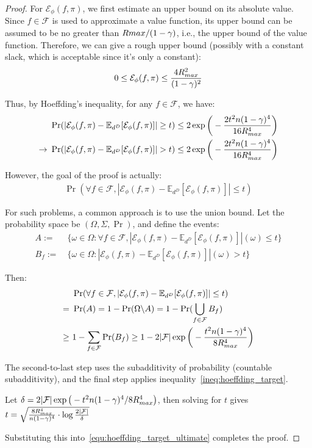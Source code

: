 \documentclass[10pt,a4paper]{amsart}
\newcommand{\CAL}[1]{\mathcal{#1}}
\begin{document}
\begin{proof}
For $\CAL{E}_\phi(f,\pi)$, we first estimate an upper bound on its absolute value. Since $f \in \CAL{F}$ is used to approximate a value function, its upper bound can be assumed to be no greater than $R{\rm max}/(1 - \gamma)$, i.e., the upper bound of the value function. Therefore, we can give a rough upper bound (possibly with a constant slack, which is acceptable since it’s only a constant):
\begin{align*}
0\leq \CAL{E}_\phi(f,\pi)\leq \frac{4R_{\rm max}^2}{(1-\gamma)^2}
\end{align*}

Thus, by Hoeffding’s inequality, for any $f \in \CAL{F}$, we have:
\begin{align}
&\ \Pr(|\mathcal{E}_\phi(f,\pi)-\mathbb{E}_{d^{D}}[\mathcal{E}_\phi(f,\pi)]|\geq t)\leq 2\exp\bigg(-\frac{2t^2n(1-\gamma)^4}{16R_{\rm max}^4}\bigg)\nonumber\\
        \to&\ \Pr(|\mathcal{E}_\phi(f,\pi)-\mathbb{E}_{d^{D}}[\mathcal{E}_\phi(f,\pi)]|> t)\leq 2\exp\bigg(-\frac{2t^2n(1-\gamma)^4}{16R_{\rm max}^4}\bigg)\label{ineq:hoeffding_target}
\end{align}

However, the goal of the proof is actually:
\begin{align}\label{equ:hoeffding_target_ultimate}
\Pr(\forall f\in\CAL{F}, |\mathcal{E}_\phi(f,\pi)-\mathbb{E}_{d^{D}}[\mathcal{E}_\phi(f,\pi)]|\leq t)
\end{align}

For such problems, a common approach is to use the union bound. Let the probability space be $(\Omega, \Sigma, \Pr)$, and define the events:
\begin{align*}
A:=&\ \{\omega\in\Omega:\forall f\in\CAL{F},|\mathcal{E}_\phi(f,\pi)-\mathbb{E}_{d^{D}}[\mathcal{E}_\phi(f,\pi)]|(\omega)\leq t\}\\
        B_f:=&\ \{\omega\in\Omega: |\mathcal{E}_\phi(f,\pi)-\mathbb{E}_{d^{D}}[\mathcal{E}_\phi(f,\pi)]|(\omega)> t\}
\end{align*}

Then:
\begin{align}
&\ \Pr(\forall f\in\CAL{F}, |\mathcal{E}_\phi(f,\pi)-\mathbb{E}_{d^{D}}[\mathcal{E}_\phi(f,\pi)]|\leq t)\nonumber\\
        =&\ \Pr(A)\nonumber
        = 1-\Pr(\Omega\backslash A)
        = 1-\Pr(\bigcup_{f\in\CAL{F}}B_f)\\
        \geq&\ 1-\sum_{f\in\CAL{F}}\Pr(B_f)
        \geq 1-2|\CAL{F}|\exp \bigg(-\frac{t^2n(1-\gamma)^4}{8R_{\rm max}^4}\bigg)
\end{align}

The second-to-last step uses the subadditivity of probability (countable subadditivity), and the final step applies inequality~\eqref{ineq:hoeffding_target}.

Let $\delta = 2|\CAL{F}|\exp \big(-{t^2n(1-\gamma)^4}/{8R_{\rm max}^4}\big)$, then solving for $t$ gives $t = \sqrt{\frac{8R_{\rm max}^4}{n(1-\gamma)^4}\cdot\log\frac{2|\CAL{F}|}{\delta}}$

Substituting this into~\eqref{equ:hoeffding_target_ultimate} completes the proof.
\end{proof}
\end{document}
